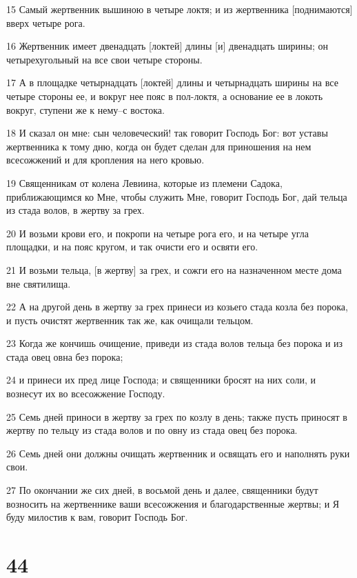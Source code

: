 \par 15 Самый жертвенник вышиною в четыре локтя; и из жертвенника [поднимаются] вверх четыре рога.
\par 16 Жертвенник имеет двенадцать [локтей] длины [и] двенадцать ширины; он четырехугольный на все свои четыре стороны.
\par 17 А в площадке четырнадцать [локтей] длины и четырнадцать ширины на все четыре стороны ее, и вокруг нее пояс в пол-локтя, а основание ее в локоть вокруг, ступени же к нему--с востока.
\par 18 И сказал он мне: сын человеческий! так говорит Господь Бог: вот уставы жертвенника к тому дню, когда он будет сделан для приношения на нем всесожжений и для кропления на него кровью.
\par 19 Священникам от колена Левиина, которые из племени Садока, приближающимся ко Мне, чтобы служить Мне, говорит Господь Бог, дай тельца из стада волов, в жертву за грех.
\par 20 И возьми крови его, и покропи на четыре рога его, и на четыре угла площадки, и на пояс кругом, и так очисти его и освяти его.
\par 21 И возьми тельца, [в жертву] за грех, и сожги его на назначенном месте дома вне святилища.
\par 22 А на другой день в жертву за грех принеси из козьего стада козла без порока, и пусть очистят жертвенник так же, как очищали тельцом.
\par 23 Когда же кончишь очищение, приведи из стада волов тельца без порока и из стада овец овна без порока;
\par 24 и принеси их пред лице Господа; и священники бросят на них соли, и вознесут их во всесожжение Господу.
\par 25 Семь дней приноси в жертву за грех по козлу в день; также пусть приносят в жертву по тельцу из стада волов и по овну из стада овец без порока.
\par 26 Семь дней они должны очищать жертвенник и освящать его и наполнять руки свои.
\par 27 По окончании же сих дней, в восьмой день и далее, священники будут возносить на жертвеннике ваши всесожжения и благодарственные жертвы; и Я буду милостив к вам, говорит Господь Бог.

\chapter{44}

